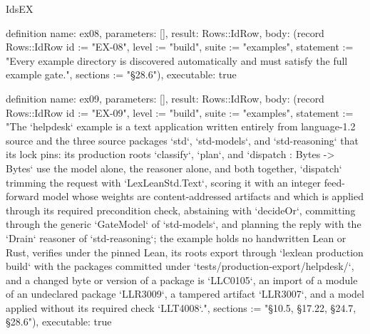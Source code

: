 \begin{lexlean}{IdsEX}
\begin{semanticmodule}
definition{
  name: ex08,
  parameters: [],
  result: Rows::IdRow,
  body: (record Rows::IdRow {id := "EX-08", level := "build", suite := "examples", statement := "Every example directory is discovered automatically and must satisfy the full example gate.", sections := "§28.6"}),
  executable: true
}

definition{
  name: ex09,
  parameters: [],
  result: Rows::IdRow,
  body: (record Rows::IdRow {id := "EX-09", level := "build", suite := "examples", statement := "The `helpdesk` example is a text application written entirely from language-1.2 source and the three source packages `std`, `std-models`, and `std-reasoning` that its lock pins: its production roots `classify`, `plan`, and `dispatch : Bytes -> Bytes` use the model alone, the reasoner alone, and both together, `dispatch` trimming the request with `LexLeanStd.Text`, scoring it with an integer feed-forward model whose weights are content-addressed artifacts and which is applied through its required precondition check, abstaining with `decideOr`, committing through the generic `GateModel` of `std-models`, and planning the reply with the `Drain` reasoner of `std-reasoning`; the example holds no handwritten Lean or Rust, verifies under the pinned Lean, its roots export through `lexlean production build` with the packages committed under `tests/production-export/helpdesk/`, and a changed byte or version of a package is `LLC0105`, an import of a module of an undeclared package `LLR3009`, a tampered artifact `LLR3007`, and a model applied without its required check `LLT4008`.", sections := "§10.5, §17.22, §24.7, §28.6"}),
  executable: true
}
\end{semanticmodule}
\end{lexlean}

